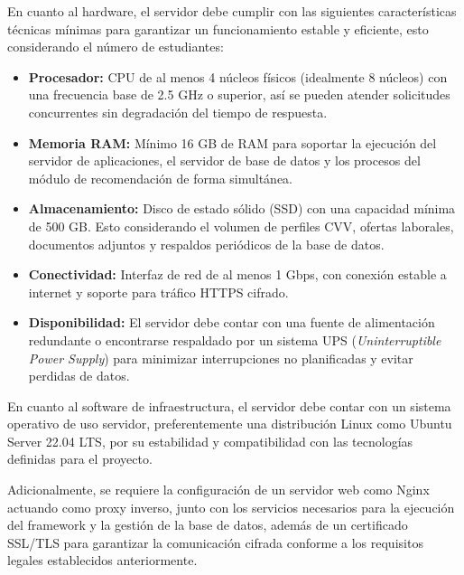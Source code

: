 \documentclass[11pt,a4paper]{Plantilla}
\begin{document}
\vspace{5pt}

En cuanto al hardware, el servidor debe cumplir con las siguientes características técnicas mínimas para garantizar un funcionamiento estable y eficiente, esto considerando el número de estudiantes:

\vspace{5pt}

\begin{itemize}
    \item \textbf{Procesador:} CPU de al menos 4 núcleos físicos (idealmente 8 núcleos) con una frecuencia base de 2.5 GHz o superior, así se pueden atender solicitudes concurrentes sin degradación del tiempo de respuesta.
    \item \textbf{Memoria RAM:} Mínimo 16 GB de RAM para soportar la ejecución del servidor de aplicaciones, el servidor de base de datos y los procesos del módulo de recomendación de forma simultánea.
    \item \textbf{Almacenamiento:} Disco de estado sólido (SSD) con una capacidad mínima de 500 GB. Esto considerando el volumen de perfiles CVV, ofertas laborales, documentos adjuntos y respaldos periódicos de la base de datos. 
    \item \textbf{Conectividad:} Interfaz de red de al menos 1 Gbps, con conexión estable a internet y soporte para tráfico HTTPS cifrado.
    \item \textbf{Disponibilidad:} El servidor debe contar con una fuente de alimentación redundante o encontrarse respaldado por un sistema UPS (\textit{Uninterruptible Power Supply}) para minimizar interrupciones no planificadas y evitar perdidas de datos.
\end{itemize}

\vspace{5pt}

En cuanto al software de infraestructura, el servidor debe contar con un sistema operativo de uso servidor, preferentemente una distribución Linux como Ubuntu Server 22.04 LTS, por su estabilidad y compatibilidad con las tecnologías definidas para el proyecto. 

\vspace{5pt}

Adicionalmente, se requiere la configuración de un servidor web como Nginx actuando como proxy inverso, junto con los servicios necesarios para la ejecución del framework y la gestión de la base de datos, además de un certificado SSL/TLS para garantizar la comunicación cifrada conforme a los requisitos legales establecidos anteriormente.
\end{document}
